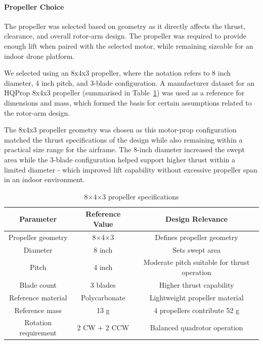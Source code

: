 \documentclass{report_template_oxford}
\begin{document}

\paragraph{Propeller Choice}

The propeller was selected based on geometry as it directly affects the thrust, clearance, and overall rotor-arm design. The propeller was required to provide enough lift when paired with the selected motor, while remaining sizeable for an indoor drone platform. 

We selected using an 8x4x3 propeller, where the notation refers to 8 inch diameter, 4 inch pitch, and 3-blade configuration. A manufacturer dataset for an HQProp 8x4x3 propeller (summarised in Table~\ref{tab:propeller_specifications}) was used as a reference for dimensions and mass, which formed the basis for certain assumptions related to the rotor-arm design.

The 8x4x3 propeller geometry was chosen as this motor-prop configuration matched the thrust specifications of the design while also remaining within a practical size range for the airframe. The 8-inch diameter increased the swept area while the 3-blade configuration helped support higher thrust within a limited diameter - which improved lift capability without excessive propeller span in an indoor environment.

\begin{table}[htbp]
\centering
\caption[8$\times$4$\times$3 propeller specifications]{8$\times$4$\times$3 propeller specifications\footnotemark}
\label{tab:propeller_specifications}
\begin{tabular}{|c|c|c|}
\hline
\textbf{Parameter} & \textbf{Reference Value} & \textbf{Design Relevance} \\
\hline
Propeller geometry & 8$\times$4$\times$3 & Defines propeller geometry \\
\hline
Diameter & 8 inch & Sets swept area \\
\hline
Pitch & 4 inch & Moderate pitch suitable for thrust operation \\
\hline
Blade count & 3 blades &  Higher thrust capability  \\
\hline
Reference material & Polycarbonate & Lightweight propeller material \\
\hline
Reference mass & 13 g & 4 propellers contribute 52 g \\
\hline
Rotation requirement & 2 CW + 2 CCW & Balanced quadrotor operation \\
\hline
\end{tabular}
\end{table}
\end{document}
